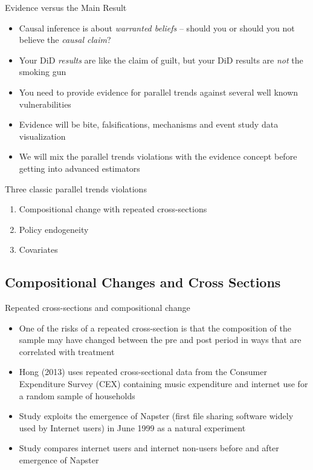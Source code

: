 \documentclass{beamer}
\begin{document}
\begin{frame}{Evidence versus the Main Result}

\begin{itemize}
\item Causal inference is about \emph{warranted beliefs} -- should you or should you not believe the \emph{causal claim}?
\item Your DiD \emph{results} are like the claim of guilt, but your DiD results are \emph{not} the smoking gun
\item You need to provide evidence for parallel trends against several well known vulnerabilities
\item Evidence will be bite, falsifications, mechanisms and event study data visualization 
\item We will mix the parallel trends violations with the evidence concept before getting into advanced estimators
\end{itemize}

\end{frame}





\begin{frame}{Three classic parallel trends violations}

	\begin{enumerate}
	\item Compositional change with repeated cross-sections
	\item Policy endogeneity
	\item Covariates
	\end{enumerate}
\bigskip



\end{frame}

\subsection{Compositional Changes and Cross Sections}



\begin{frame}{Repeated cross-sections and compositional change}
	
	\begin{itemize}
	\item One of the risks of a repeated cross-section is that the composition of the sample may have changed between the pre and post period in ways that are correlated with treatment
	\item Hong (2013) uses repeated cross-sectional data from the Consumer Expenditure Survey (CEX) containing music expenditure and internet use for a random sample of households
	\item Study exploits the emergence of Napster (first file sharing software widely used by Internet users) in June 1999 as a natural experiment
	\item Study compares internet users and internet non-users before and after emergence of Napster
	\end{itemize}

\end{frame}
\end{document}
